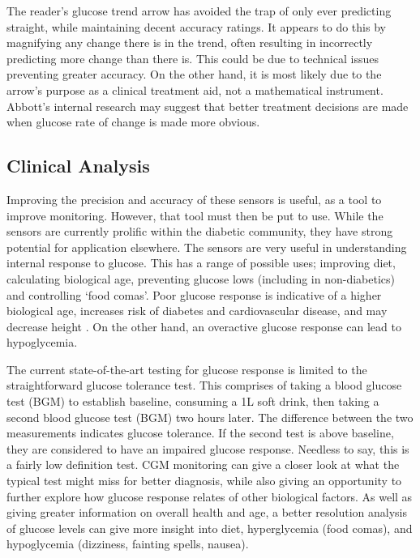 The reader’s glucose trend arrow has avoided the trap of only ever predicting straight, while maintaining decent accuracy ratings. It appears to do this by magnifying any change there is in the trend, often resulting in incorrectly predicting more change than there is. This could be due to technical issues preventing greater accuracy. On the other hand, it is most likely due to the arrow's purpose as a clinical treatment aid, not a mathematical instrument. Abbott's internal research may suggest that better treatment decisions are made when glucose rate of change is made more obvious.



\subsection{Clinical Analysis}
Improving the precision and accuracy of these sensors is useful, as a tool to improve monitoring. However, that tool must then be put to use. While the sensors are currently prolific within the diabetic community, they have strong potential for application elsewhere. The sensors are very useful in understanding internal response to glucose. This has a range of possible uses; improving diet, calculating biological age, preventing glucose lows (including in non-diabetics) and controlling ‘food comas’. Poor glucose response is indicative of a higher biological age, increases risk of diabetes and cardiovascular disease, and may decrease height \cite{williams_impaired_1991}\cite{lawes_blood_2004}. On the other hand, an overactive glucose response can lead to hypoglycemia. 

The current state-of-the-art testing for glucose response is limited to the straightforward glucose tolerance test. This comprises of taking a blood glucose test (BGM) to establish baseline, consuming a 1L soft drink, then taking a second blood glucose test (BGM) two hours later. The difference between the two measurements indicates glucose tolerance. If the second test is above baseline, they are considered to have an impaired glucose response. Needless to say, this is a fairly low definition test. CGM monitoring can give a closer look at what the typical test might miss for better diagnosis, while also giving an opportunity to further explore how glucose response relates of other biological factors. As well as giving greater information on overall health and age, a better resolution analysis of glucose levels can give more insight into diet, hyperglycemia (food comas), and hypoglycemia (dizziness, fainting spells, nausea).

